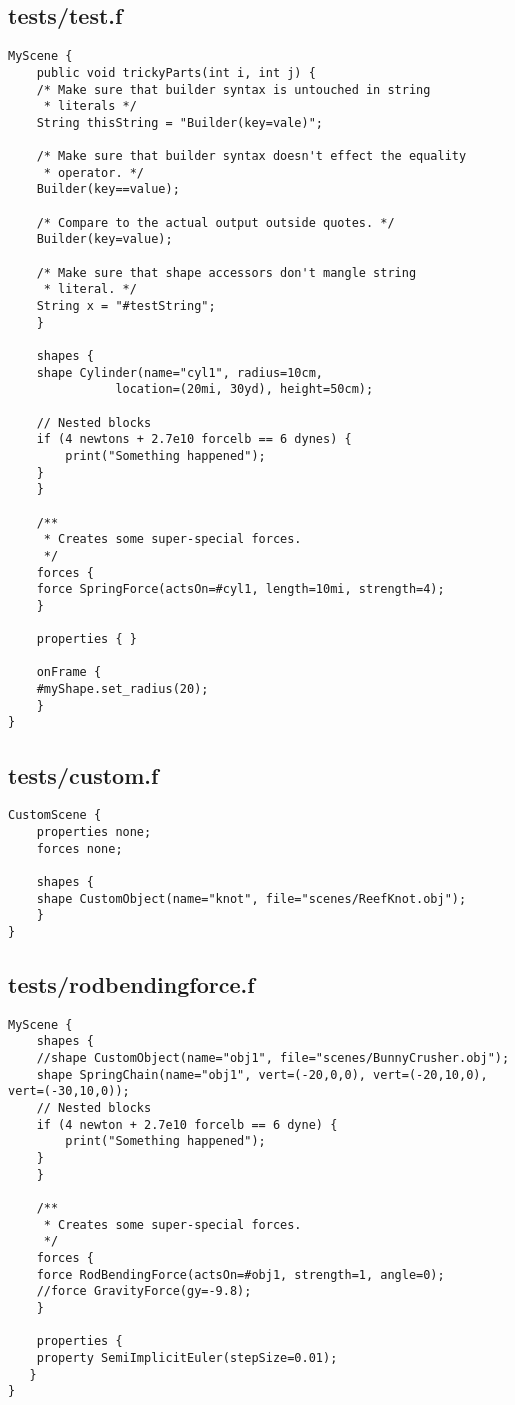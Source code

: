 \subsection*{tests/test.f}
\begin{lstlisting}
MyScene {
    public void trickyParts(int i, int j) {
	/* Make sure that builder syntax is untouched in string
	 * literals */
	String thisString = "Builder(key=vale)";

	/* Make sure that builder syntax doesn't effect the equality
	 * operator. */
	Builder(key==value);

	/* Compare to the actual output outside quotes. */
	Builder(key=value);

	/* Make sure that shape accessors don't mangle string
	 * literal. */
	String x = "#testString";
    }
	
    shapes {
	shape Cylinder(name="cyl1", radius=10cm, 
		       location=(20mi, 30yd), height=50cm);

	// Nested blocks
	if (4 newtons + 2.7e10 forcelb == 6 dynes) {
	    print("Something happened");
	}
    }

    /**
     * Creates some super-special forces.
     */
    forces {
	force SpringForce(actsOn=#cyl1, length=10mi, strength=4);
    }

    properties { }

    onFrame {
	#myShape.set_radius(20);
    }
}
\end{lstlisting}

\subsection*{tests/custom.f}
\begin{lstlisting}
CustomScene {
    properties none;
    forces none;

    shapes {
	shape CustomObject(name="knot", file="scenes/ReefKnot.obj");
    }
}
\end{lstlisting}

\subsection*{tests/rodbendingforce.f}
\begin{lstlisting}
MyScene {
    shapes {
	//shape CustomObject(name="obj1", file="scenes/BunnyCrusher.obj");
	shape SpringChain(name="obj1", vert=(-20,0,0), vert=(-20,10,0), vert=(-30,10,0));
	// Nested blocks
	if (4 newton + 2.7e10 forcelb == 6 dyne) {
	    print("Something happened");
	}
    }

    /**
     * Creates some super-special forces.
     */
    forces {
	force RodBendingForce(actsOn=#obj1, strength=1, angle=0);
	//force GravityForce(gy=-9.8);
    }

    properties { 
	property SemiImplicitEuler(stepSize=0.01);
   }
}
\end{lstlisting}

